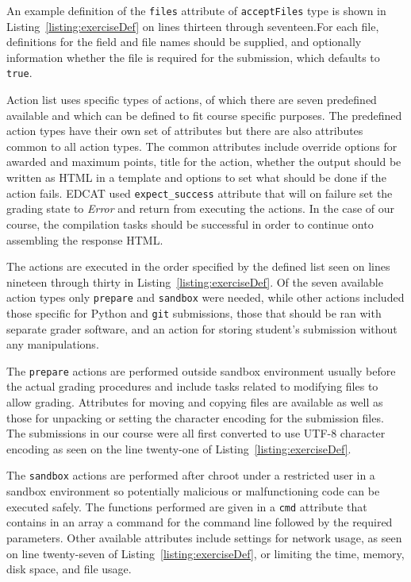 An example definition of the \texttt{files} attribute of \texttt{acceptFiles} type is shown in Listing~\ref{listing:exerciseDef} on lines thirteen through seventeen.For each file, definitions for the field and file names should be supplied, and optionally information whether the file is required for the submission, which defaults to \texttt{true}.

Action list uses specific types of actions, of which there are seven predefined available and which can be defined to fit course specific purposes. The predefined action types have their own set of attributes but there are also attributes common to all action types. The common attributes include override options for awarded and maximum points, title for the action, whether the output should be written as HTML in a template and options to set what should be done if the action fails. EDCAT used \texttt{expect\_success} attribute that will on failure set the grading state to \emph{Error} and return from executing the actions. In the case of our course, the compilation tasks should be successful in order to continue onto assembling the response HTML.

The actions are executed in the order specified by the defined list seen on lines nineteen through thirty in Listing~\ref{listing:exerciseDef}. Of the seven available action types only \texttt{prepare} and \texttt{sandbox} were needed, while other actions included those specific for Python and \texttt{git} submissions, those that should be ran with separate grader software, and an action for storing student's submission without any manipulations.

The \texttt{prepare} actions are performed outside sandbox environment usually before the actual grading procedures and include tasks related to modifying files to allow grading. Attributes for moving and copying files are available as well as those for unpacking or setting the character encoding for the submission files. The submissions in our course were all first converted to use UTF-8 character encoding as seen on the line twenty-one of Listing~\ref{listing:exerciseDef}.

The \texttt{sandbox} actions are performed after chroot under a restricted user in a sandbox environment so potentially malicious or malfunctioning code can be executed safely. The functions performed are given in a \texttt{cmd} attribute that contains in an array a command for the command line followed by the required parameters. Other available attributes include settings for network usage, as seen on line twenty-seven of Listing~\ref{listing:exerciseDef}, or limiting the time, memory, disk space, and file usage. 


